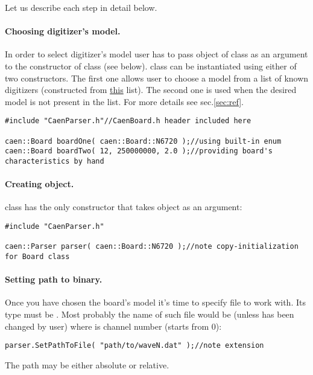 \noindent Let us describe each step in detail below.

\paragraph*{Choosing digitizer's model.}
In order to select digitizer's model user has to pass object of  class
as an argument to the constructor of  class (see below). 
class can be instantiated using either of two constructors. The first one allows
user to choose a model from a list of known digitizers
(constructed from \href{https://www.caen.it/subfamilies/digitizers/}{this} list).
The second one is used when the desired model is not present in the list. For more
details see sec.\ref{sec:ref}.

\begin{lstlisting}
#include "CaenParser.h"//CaenBoard.h header included here

caen::Board boardOne( caen::Board::N6720 );//using built-in enum
caen::Board boardTwo( 12, 250000000, 2.0 );//providing board's characteristics by hand 
\end{lstlisting}


\paragraph*{Creating  object.}
 class has the only constructor that takes  object as an
argument:
\begin{lstlisting}
#include "CaenParser.h"

caen::Parser parser( caen::Board::N6720 );//note copy-initialization for Board class
\end{lstlisting}

\paragraph*{Setting path to binary.}
Once you have chosen the board's model it's time to specify
file to work with. Its type must be . Most probably the
name of such file would be  (unless has been changed by user) where
 is channel number (starts
from 0):
\begin{lstlisting}
parser.SetPathToFile( "path/to/waveN.dat" );//note extension   
\end{lstlisting}
The path may be either absolute or relative.

